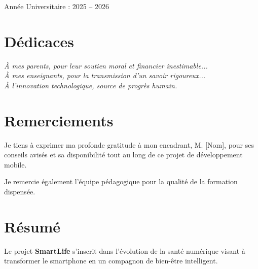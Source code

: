 \documentclass[12pt,a4paper,oneside]{report}
\begin{document}
\begin{titlepage}
        \vfill

        {\large Année Universitaire : 2025 -- 2026}

    \end{titlepage}

    \chapter*{Dédicaces}

    \vspace*{2cm}

    \begin{flushright}

        \textit{À mes parents, pour leur soutien moral et financier inestimable...}\\

        \textit{À mes enseignants, pour la transmission d’un savoir rigoureux...}\\

        \textit{À l’innovation technologique, source de progrès humain.}

    \end{flushright}

    \chapter*{Remerciements}

    Je tiens à exprimer ma profonde gratitude à mon encadrant, M. [Nom], pour ses conseils avisés et sa disponibilité tout au long de ce projet de développement mobile.

    Je remercie également l’équipe pédagogique pour la qualité de la formation dispensée.

    \chapter*{Résumé}

    Le projet \textbf{SmartLife} s’inscrit dans l’évolution de la santé numérique visant à transformer le smartphone en un compagnon de bien-être intelligent.
\end{document}

